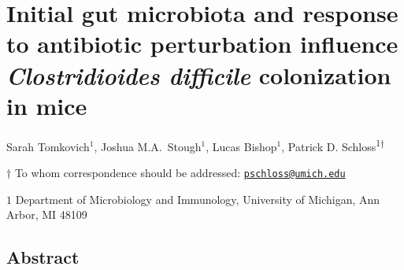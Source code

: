 \documentclass[11pt,]{article}
\title{}
\author{}
\date{}
\begin{document}
\vspace{35mm}

\section{\texorpdfstring{Initial gut microbiota and response to
antibiotic perturbation influence \emph{Clostridioides difficile}
colonization in
mice}{Initial gut microbiota and response to antibiotic perturbation influence Clostridioides difficile colonization in mice}}\label{initial-gut-microbiota-and-response-to-antibiotic-perturbation-influence-clostridioides-difficile-colonization-in-mice}

\vspace{35mm}

Sarah Tomkovich\({^1}\), Joshua M.A.~Stough\({^1}\), Lucas
Bishop\({^1}\), Patrick D. Schloss\textsuperscript{1\(\dagger\)}

\vspace{40mm}

\(\dagger\) To whom correspondence should be addressed:
\href{mailto:pschloss@umich.edu}{\nolinkurl{pschloss@umich.edu}}

\(1\) Department of Microbiology and Immunology, University of Michigan,
Ann Arbor, MI 48109

\newpage

\linenumbers

\subsection{Abstract}\label{abstract}
\end{document}
